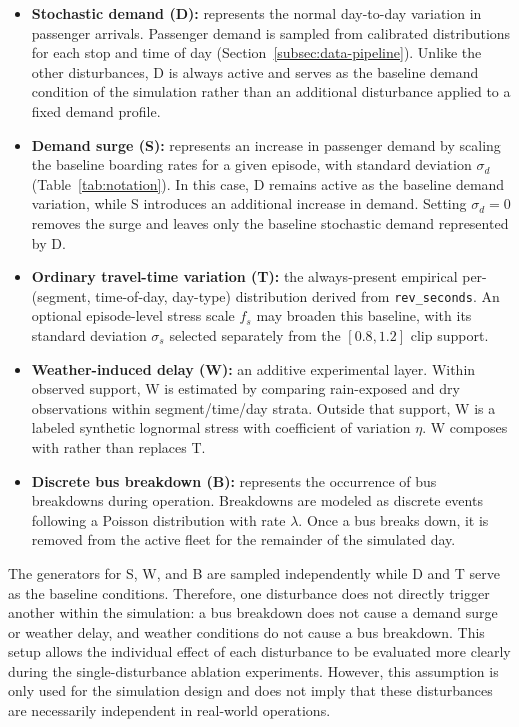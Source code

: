 \begin{itemize}
\item \textbf{Stochastic demand (D):} represents the normal day-to-day variation in passenger arrivals. Passenger demand is sampled from calibrated distributions for each stop and time of day (Section~\ref{subsec:data-pipeline}). Unlike the other disturbances, D is always active and serves as the baseline demand condition of the simulation rather than an additional disturbance applied to a fixed demand profile.
\item \textbf{Demand surge (S):} represents an increase in passenger demand by scaling the baseline boarding rates for a given episode, with standard deviation $\sigma_d$ (Table~\ref{tab:notation}). In this case, D remains active as the baseline demand variation, while S introduces an additional increase in demand. Setting $\sigma_d = 0$ removes the surge and leaves only the baseline stochastic demand represented by D.
\item \textbf{Ordinary travel-time variation (T):} the always-present empirical per-(segment, time-of-day, day-type) distribution derived from \texttt{rev\_seconds}. An optional episode-level stress scale $f_s$ may broaden this baseline, with its standard deviation $\sigma_s$ selected separately from the $[0.8,1.2]$ clip support.
\item \textbf{Weather-induced delay (W):} an additive experimental layer. Within observed support, W is estimated by comparing rain-exposed and dry observations within segment/time/day strata. Outside that support, W is a labeled synthetic lognormal stress with coefficient of variation $\eta$. W composes with rather than replaces T.
\item \textbf{Discrete bus breakdown (B):} represents the occurrence of bus breakdowns during operation. Breakdowns are modeled as discrete events following a Poisson distribution with rate $\lambda$. Once a bus breaks down, it is removed from the active fleet for the remainder of the simulated day.
\end{itemize}

The generators for S, W, and B are sampled independently while D and T serve as the baseline conditions. Therefore, one disturbance does not directly trigger another within the simulation: a bus breakdown does not cause a demand surge or weather delay, and weather conditions do not cause a bus breakdown. This setup allows the individual effect of each disturbance to be evaluated more clearly during the single-disturbance ablation experiments. However, this assumption is only used for the simulation design and does not imply that these disturbances are necessarily independent in real-world operations.


